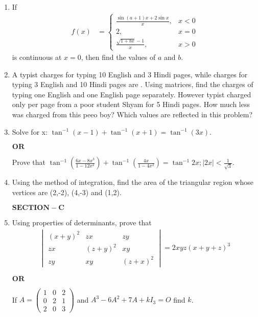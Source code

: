 \documentclass[12pt,-letter paper]{article}
\providecommand{\brak}[1]{\ensuremath{\left(#1\right)}}
\theoremstyle{remark}
\providecommand{\abs}[1]{\left\vert#1\right\vert}
\newcommand{\myvec}[1]{\ensuremath{\begin{pmatrix}#1\end{pmatrix}}}
\newcommand{\mydet}[1]{\ensuremath{\begin{vmatrix}#1\end{vmatrix}}}
\let\vec\mathbf
\begin{document}
\begin{enumerate}
\item If \begin{align}f(x) &= \begin{cases}\frac{\sin(a+1)x + 2\sin x}{x}, &x<0\\ 2, &x=0 \\ \frac{\sqrt{1+bx}-1}{x}, &x>0 \end{cases}\end{align} is continuous at $x=0$, then find the values of $a$ and $b$.\\

\item A typist charges  for typing 10 English and 3 Hindi pages, while charges for typing 3 English and 10 Hindi pages are . Using matrices, find the charges of typing one English and one English page separately. However typist charged only  per page from a poor student Shyam for 5 Hindi pages. How much less was charged from this peeo boy? Which values are reflected in this problem?\\

\item Solve for x: $\tan^{-1}(x-1) + \tan^{-1}(x+1) = \tan^{-1}(3x)$.
\begin{center} $\vec{OR}$ \\ \end{center}
Prove that $\tan^{-1}\brak{\frac{6x-8x^3}{1-12x^2}} + \tan^{-1}\brak{\frac{4x}{1-4x^2}} = \tan^{-1}2x; \abs{2x}<\frac{1}{\sqrt{3}}$.\\

\item Using the method of integration, find the area of the triangular region whose vertices are (2,-2), (4,-3) and (1,2).\\

\begin{center} $\vec{SECTION-C}$ \\ \end{center}

\item Using properties of determinants, prove that
\begin{align*}\mydet{\brak{x+y}^2 & zx & zy \\ zx & \brak{z+y}^2 & xy \\ zy & xy & \brak{z+x}^2} = 2xyz\brak{x+y+z}^3
\end{align*}
\begin{center} $\vec{OR}$ \\ \end{center}
If $A = \myvec{1 & 0 & 2 \\ 0 & 2 & 1 \\ 2 & 0 & 3}$ and $A^3 - 6A^2 + 7A + kI_3 = O$ find $k$.


\end{enumerate}
\end{document}
